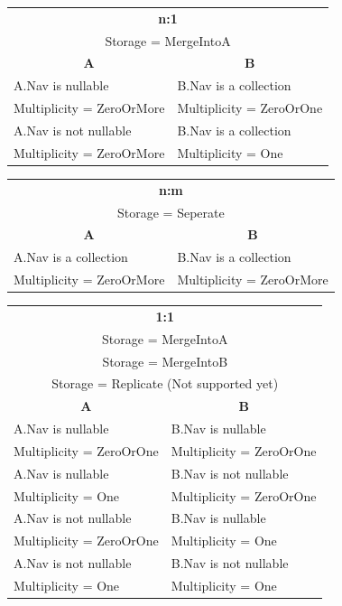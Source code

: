 \begin{center}
	\begin{tabular}{|p{5cm}|p{5cm}|}
	\hline
		\multicolumn{2}{|c|}{\textbf{n:1}} \\ 
		\multicolumn{2}{|c|}{ Storage = MergeIntoA } \\
	\hline
		\multicolumn{1}{|c|}{\textbf{A}} & \multicolumn{1}{|c|}{\textbf{B}} \\
	\hline
		A.Nav is nullable & B.Nav is a collection \\
		Multiplicity = ZeroOrMore & Multiplicity = ZeroOrOne\\
	\hline
		A.Nav is not nullable & B.Nav is a collection \\
		Multiplicity = ZeroOrMore & Multiplicity = One \\
	\hline
	\end{tabular}
\end{center}

\begin{center}
	\begin{tabular}{|p{5cm}|p{5cm}|}
	\hline
		\multicolumn{2}{|c|}{\textbf{n:m}} \\ 
		\multicolumn{2}{|c|}{ Storage = Seperate } \\
	\hline
		\multicolumn{1}{|c|}{\textbf{A}} & \multicolumn{1}{|c|}{\textbf{B}} \\
	\hline
		A.Nav is a collection & B.Nav is a collection \\
		Multiplicity = ZeroOrMore & Multiplicity = ZeroOrMore \\
	\hline
	\end{tabular}
\end{center}

\begin{center}
	\begin{tabular}{|p{5cm}|p{5cm}|}
	\hline
		\multicolumn{2}{|c|}{\textbf{1:1}} \\ 
		\multicolumn{2}{|c|}{ Storage = MergeIntoA } \\
		\multicolumn{2}{|c|}{ Storage = MergeIntoB } \\
		\multicolumn{2}{|c|}{ Storage = Replicate (Not supported yet) } \\
	\hline
		\multicolumn{1}{|c|}{\textbf{A}} & \multicolumn{1}{|c|}{\textbf{B}} \\
	\hline
		A.Nav is nullable & B.Nav is nullable \\
		Multiplicity = ZeroOrOne & Multiplicity = ZeroOrOne \\
	\hline
		A.Nav is nullable & B.Nav is not nullable \\
		Multiplicity = One & Multiplicity = ZeroOrOne \\
	\hline
		A.Nav is not nullable & B.Nav is nullable \\
		Multiplicity = ZeroOrOne & Multiplicity = One \\
	\hline
		A.Nav is not nullable & B.Nav is not nullable \\
		Multiplicity = One & Multiplicity = One \\
	\hline
	\end{tabular}
\end{center}

